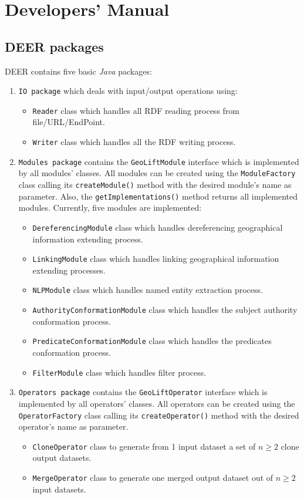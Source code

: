 \documentclass[a4paper,twoside,bibtotoc,abstracton,12pt,BCOR=15mm]{article}
\newcommand{\geolift}{\textsc{DEER}\xspace}
\begin{document}
\section{Developers' Manual}

\subsection{\geolift packages}
\geolift contains five basic \emph{Java} packages: 
\begin{enumerate}
 \item \texttt{IO package} which deals with input/output operations using:
   \begin{itemize}
    \item \texttt{Reader} class which handles all RDF reading process from file/URL/EndPoint. 
    \item \texttt{Writer} class which handles all the RDF writing process. 
  \end{itemize}

  \item\texttt{Modules package} contains the \texttt{GeoLiftModule} interface which is implemented by all modules' classes.
      All modules can be created using the \texttt{ModuleFactory} class calling its \texttt{createModule()} method with the desired module's name as parameter.
      Also, the \texttt{getImplementations()} method returns all implemented modules.
      Currently, five modules are implemented:
      \begin{itemize}
	\item \texttt{DereferencingModule} class which handles dereferencing  geographical information extending process. 
	\item \texttt{LinkingModule} class which handles linking geographical information extending processes. 
	\item \texttt{NLPModule} class which handles named entity extraction process.
	\item \texttt{AuthorityConformationModule} class which handles the subject authority conformation process.
	\item \texttt{PredicateConformationModule} class which handles the predicates conformation process.
	\item \texttt{FilterModule} class which handles filter process.
      \end{itemize}
  
   \item \texttt{Operators package} contains the \texttt{GeoLiftOperator} interface which is implemented by all operators' classes.
    All operators can be created using the \texttt{OperatorFactory} class calling its \texttt{createOperator()} method with the desired operator's name as parameter.
      \begin{itemize}
	\item \texttt{CloneOperator} class to generate from 1 input dataset a set of $n \geq 2$ clone output datasets.
	\item \texttt{MergeOperator} class to generate one merged output dataset out of $n \geq 2$ input datasets.
      \end{itemize}
 

\end{enumerate}
\end{document}
